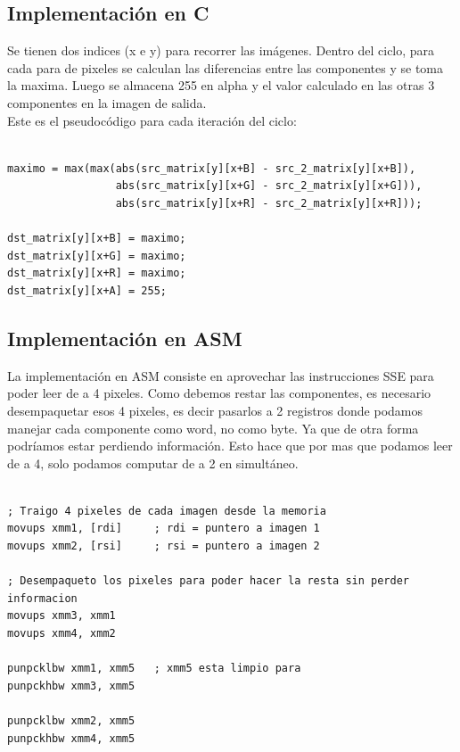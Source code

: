 \documentclass[10pt,a4paper,spanish]{article}
\begin{document}
\subsection{Implementación en C}

Se tienen dos indices (x e y) para recorrer las imágenes. Dentro del ciclo, para cada para de pixeles se calculan las diferencias entre las componentes y se toma la maxima. Luego se almacena 255 en alpha y el valor calculado en las otras 3 componentes en la imagen de salida. \\

Este es el pseudocódigo para cada iteración del ciclo:

\begin{codesnippet}
\begin{verbatim}

maximo = max(max(abs(src_matrix[y][x+B] - src_2_matrix[y][x+B]),
                 abs(src_matrix[y][x+G] - src_2_matrix[y][x+G])),
                 abs(src_matrix[y][x+R] - src_2_matrix[y][x+R]));

dst_matrix[y][x+B] = maximo;
dst_matrix[y][x+G] = maximo;
dst_matrix[y][x+R] = maximo;
dst_matrix[y][x+A] = 255;

\end{verbatim}
\end{codesnippet}

\subsection{Implementación en ASM}

La implementación en ASM consiste en aprovechar las instrucciones SSE para poder leer de a 4 pixeles. Como debemos restar las componentes, es necesario desempaquetar esos 4 pixeles, es decir pasarlos a 2 registros donde podamos manejar cada componente como word, no como byte. Ya que de otra forma podríamos estar perdiendo información. Esto hace que por mas que podamos leer de a 4, solo podamos computar de a 2 en simultáneo.

\begin{codesnippet}
\begin{verbatim}

; Traigo 4 pixeles de cada imagen desde la memoria
movups xmm1, [rdi]     ; rdi = puntero a imagen 1
movups xmm2, [rsi]     ; rsi = puntero a imagen 2

; Desempaqueto los pixeles para poder hacer la resta sin perder informacion
movups xmm3, xmm1
movups xmm4, xmm2

punpcklbw xmm1, xmm5   ; xmm5 esta limpio para
punpckhbw xmm3, xmm5

punpcklbw xmm2, xmm5
punpckhbw xmm4, xmm5

\end{verbatim}
\end{codesnippet}
\end{document}
